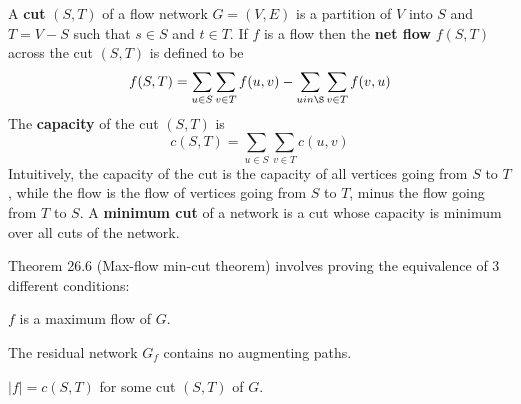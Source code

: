A \textbf{cut} $(S,T)$ of a flow network $G = (V,E)$ is a partition of $V$ into $S$ and $T=V-S$ such that
$s \in S$ and $t \in T$. If $f$ is a flow then the \textbf{net flow} $f(S,T)$ across the cut $(S,T)$ is
defined to be
%
\[
	f(S,T) = \sum_{u \in S} \sum_{v \in T} f(u,v) - \sum_{u in \S} \sum_{v \in T} f(v,u)
\]
%
The \textbf{capacity} of the cut $(S,T)$ is
%
\[
	c(S,T) = \sum_{u \in S} \sum_{v \in T} c(u,v)
\]
%
Intuitively, the capacity of the cut is the capacity of all vertices going
from $S$ to $T$, while the flow is the flow of vertices going from $S$ to $T$,
minus the flow going from $T$ to $S$. A \textbf{minimum cut} of a network is a
cut whose capacity is minimum over all cuts of the network.

Theorem 26.6 (Max-flow min-cut theorem) involves proving the equivalence of 3
different conditions:
\begin{inparaenum}[i)]
	\item $f$ is a maximum flow of $G$.
	\item The residual network $G_f$ contains no augmenting paths.
	\item $|f| = c(S,T)$ for some cut $(S,T)$ of $G$.
\end{inparaenum}

